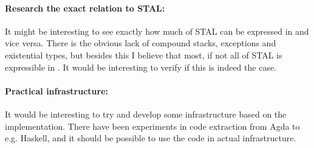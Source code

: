 \paragraph{Research the exact relation to STAL:}
It might be interesting to see exactly how much of STAL can be expressed in
\ATAL and vice versa. There is the obvious lack of compound stacks, exceptions
and existential types, but besides this I believe that most, if not all of STAL
is expressible in \ATAL. It would be interesting to verify if this is indeed the
case.

\paragraph{Practical infrastructure:}
It would be interesting to try and develop some infrastructure based on the
implementation. There have been experiments in code extraction from Agda to
e.g. Haskell, and it should be possible to use the code in actual
infrastructure.
